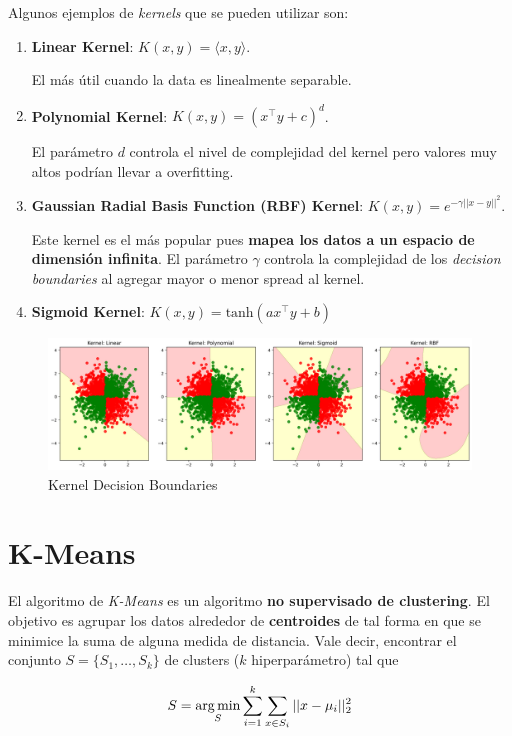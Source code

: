 Algunos ejemplos de \textit{kernels} que se pueden utilizar son: 

\begin{enumerate}
    \item \textbf{Linear Kernel}: $K(x,y) = \langle x , y \rangle$. 
    
    El más útil cuando la data es linealmente separable. 
    \item \textbf{Polynomial Kernel}: $K(x,y) = (x^{\top}y + c)^d$. 
    
    El parámetro $d$ controla el nivel de complejidad del kernel pero valores muy altos podrían llevar a overfitting.
    \item \textbf{Gaussian Radial Basis Function (RBF) Kernel}: $K(x,y) = e^{-\gamma||x-y||^2}$. 
    
    Este kernel es el más popular pues \textbf{mapea los datos a un espacio de dimensión infinita}. El parámetro $\gamma$ controla la complejidad de los \textit{decision boundaries} al agregar mayor o menor spread al kernel. 
    \item \textbf{Sigmoid Kernel}: $K(x,y) = \text{tanh}(ax^{\top}y + b)$
\end{enumerate}

\begin{figure}[H]
    \center
    \includegraphics[scale=0.35]{notebooks/ML/img/kernel_decision_boundaries.png}
    \caption{Kernel Decision Boundaries}
\end{figure}

\section{K-Means}

El algoritmo de \textit{K-Means} es un algoritmo \textbf{no supervisado de clustering}. 
El objetivo es agrupar los datos alrededor de \textbf{centroides} de tal forma en que se minimice la suma de alguna medida de distancia. Vale decir, encontrar el conjunto $ S = \{ S_1 , \dots, S_k \} $ de clusters ($k$ hiperparámetro) tal que

\begin{equation*}
\begin{aligned}
S = \operatorname*{arg\,min}_{S} \sum_{i=1}^{k}\sum_{x \in S_i}||x- \mu_i||_{2}^2
\end{aligned}
\end{equation*}

